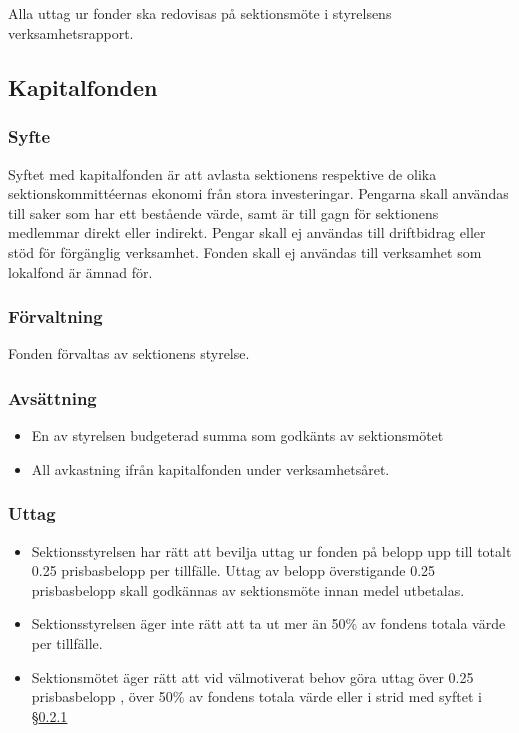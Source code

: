 \documentclass[a4paper, 10pt]{article}
\def\roundandprint #1{\xinttheiexpr #1\relax }
\newcommand{\prisbasbelopp}[1]{
    #1 prisbasbelopp 
    \ifdef{\nuvarandeprisbasbelopp}{
        \marginpar{
            \small{ \textbf{\roundandprint{\xintiexpr#1 * \nuvarandeprisbasbelopp\relax}kr}}
        }
    }{}
}
\begin{document}
\subsection{}
Alla uttag ur fonder ska redovisas på sektionsmöte i styrelsens verksamhetsrapport.

\subsection{Kapitalfonden}
\subsubsection{Syfte}
\label{sec:kapitalfond_syfte}
Syftet med kapitalfonden är att avlasta sektionens respektive de olika sektionskommittéernas ekonomi från stora investeringar. Pengarna skall användas till saker som har ett bestående värde, samt är till gagn för sektionens medlemmar direkt eller indirekt. Pengar skall ej användas till driftbidrag eller stöd för förgänglig verksamhet. Fonden skall ej användas till verksamhet som lokalfond är ämnad för.
\subsubsection{Förvaltning}
Fonden förvaltas av sektionens styrelse.
\subsubsection{Avsättning}
\begin{itemize}
\item En av styrelsen budgeterad summa som godkänts av sektionsmötet
\item All avkastning ifrån kapitalfonden under verksamhetsåret.
\end{itemize}
\subsubsection{Uttag}
\begin{itemize}
\item Sektionsstyrelsen har rätt att bevilja uttag ur fonden på belopp upp till totalt \prisbasbelopp{0.25} per tillfälle. Uttag av belopp överstigande \prisbasbelopp{0.25} skall godkännas av sektionsmöte innan medel utbetalas.
\item Sektionsstyrelsen äger inte rätt att ta ut mer än 50\% av fondens totala värde per tillfälle.
\item Sektionsmötet äger rätt att vid välmotiverat behov göra uttag över \prisbasbelopp{0.25} , över 50\% av fondens totala värde eller i strid med syftet i \S\ref{sec:kapitalfond_syfte}
\end{itemize}
\end{document}

